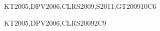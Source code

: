\begin{syllabus}
\begin{unit}{\ALFundamentalDataStructuresandAlgorithms}{}{KT2005,DPV2006,CLRS2009,S2011,GT2009}{10}{C6}
\begin{learningoutcomes}
    \item \ALFundamentalDataStructuresandAlgorithmsLODiscuss [\Usage] %
    \item \ALFundamentalDataStructuresandAlgorithmsLODiscussFactors [\Familiarity] %
    \item \ALFundamentalDataStructuresandAlgorithmsLOSolveProblems [\Assessment] %
    \item \ALFundamentalDataStructuresandAlgorithmsLODemonstrate [\Assessment] %
    \item \ALFundamentalDataStructuresandAlgorithmsLODescribeTheAnd [\Assessment] %
    \item \ALFundamentalDataStructuresandAlgorithmsLOSolveProblemsAlgorithms [\Assessment] %
\end{learningoutcomes}
\end{unit}

\begin{unit}{\ALBasicAutomataComputabilityandComplexity}{}{KT2005,DPV2006,CLRS2009}{2}{C9}
\begin{topics}%
    \item \ALBasicAutomataComputabilityandComplexityTopicIntroduction %
    \item \ALBasicAutomataComputabilityandComplexityTopicIntroductionTo %
\end{topics}
\begin{learningoutcomes}
    \item \ALBasicAutomataComputabilityandComplexityLODefine [\Familiarity] %
    \item \ALBasicAutomataComputabilityandComplexityLOExplainTheNp [\Familiarity] %
\end{learningoutcomes}
\end{unit}


\end{syllabus}
